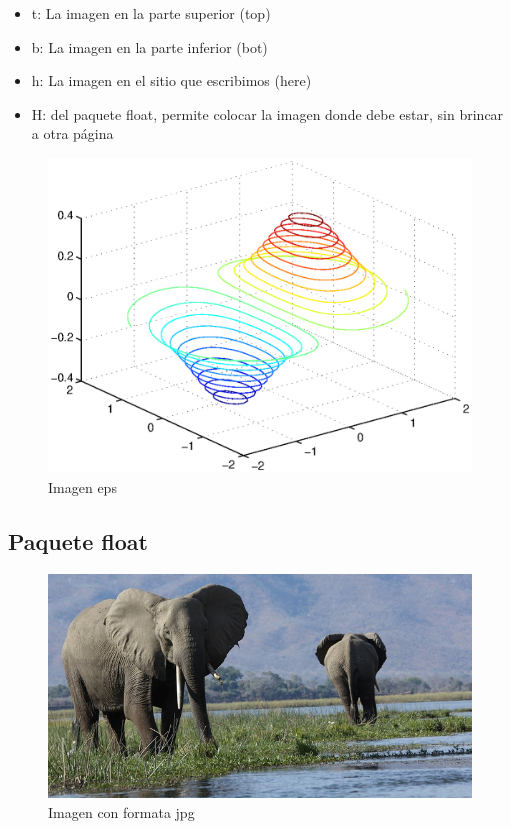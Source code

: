 \documentclass[12pt]{article}
\begin{document}
\begin{itemize}
\item t: La imagen en la parte superior (top)
\item b: La imagen en la parte inferior (bot)
\item h: La imagen en el sitio que escribimos (here)
\item H: del paquete float, permite colocar la imagen donde debe estar, sin brincar a otra página
\end{itemize}

\begin{figure}[H]
\centering
\includegraphics[scale=0.5]{figuras/imagenmat2.eps} 
\caption{Imagen eps}
\label{Figura 1}
\end{figure}

\newpage
\subsection{Paquete float}

\begin{figure}[H]
\centering
\includegraphics[scale=0.3]{figuras/elefante} 
\caption{Imagen con formata jpg}
\label{figura2}
\end{figure}
\end{document}
